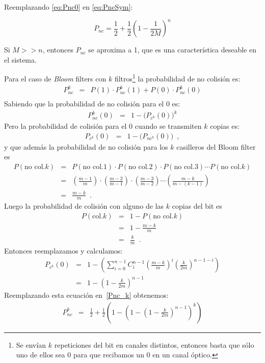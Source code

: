 Reemplazando \ref{eq:Pnc0} en \ref{eq:PncSym}:

\begin{equation}
P_{nc}=\frac{1}{2}+\frac{1}{2}(1-\frac{1}{2M})^{n}
\end{equation}

Si $M>>n$, entonces $P_{nc}$ se aproxima a 1, que es una característica deseable en el sistema.
\iffalse

\vspace{5mm}

\noindent Para el caso de {\em Bloom} filters con $k$ filtros\footnote{Se envían $k$ repeticiones del bit en canales distintos, entonces basta que sólo uno de ellos sea 0 para que recibamos un 0 en un canal óptico.} la probabilidad de no colisión es:
\begin{eqnarray} 
P_{nc}^{k} & = &  P(1) \cdot P_{nc}^{k}(1) + P(0) \cdot P_{nc}^{k}(0)\\ \label{Pnc_k}
\end{eqnarray}
Sabiendo que la probabilidad de no colisión para el 0 es:
\begin{eqnarray}
P_{nc}^{k}(0) & = & 1 - \big(P_{c^k}(0)\big)^k 
\end{eqnarray}
Pero la probabilidad de colisión para el 0 cuando se transmiten $k$ copias es:
\begin{eqnarray}
P_{c^k}(0) & = & 1 - \big(P_{nc^k}(0)\big)  \enspace,
\end{eqnarray}
y que además la probabilidad de no colisión para los $k$ casilleros del Bloom
filter es
\begin{eqnarray}
P(\mbox{no col.} k) &=& P(\mbox{no col.}1)\cdot P(\mbox{no col.}2)\cdot P(\mbox{no col.}3)\cdots P(\mbox{no col.}k)\\
&=&\left(\frac{m-1}{m}\right)\cdot\left(\frac{m-2}{m-1}\right)\cdot\left(\frac{m-3}{m-2}\right)\cdots\left(\frac{m-k}{m-(k-1)}\right)\\
&=& \frac{m-k}{m} \enspace.
\end{eqnarray}
Luego la probabilidad de colisión con alguno de las $k$ copias del bit es
\begin{eqnarray}
P(\mbox{col.}k)&=& 1-P(\mbox{no col.} k)\\
&=& 1-\frac{m-k}{m}\\
&=& \frac{k}{m} \enspace.
\end{eqnarray}
Entonces reemplazamos y calculamos:
\begin{eqnarray}
P_{c^k}(0) & = & 1 - \left(\sum_{i=0}^{n-1} C^{n-1}_{i} \left(\frac{m-k}{m}\right)^i \left(\frac{k}{2m}\right)^{n-1-i} \right)  \\
& = &  1-\left( 1-\frac{k}{2m}\right)^{n-1}
\end{eqnarray}
Reemplazando esta ecuación en~\ref{Pnc_k} obtenemos:
\begin{eqnarray}
P_{nc}^k & = & \frac{1}{2} + \frac{1}{2} \left( 1- \left( 1- \left( 1- \frac{k}{2m} \right)^{n-1}  \right)^{k}  \right) 
\end{eqnarray}

